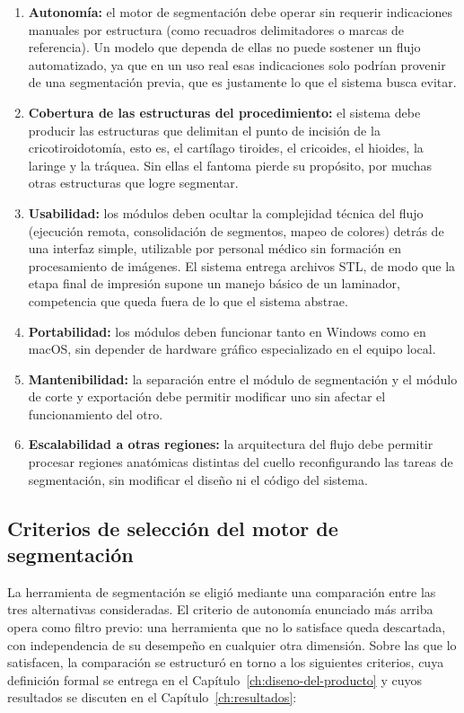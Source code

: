 \begin{enumerate}
  \item \textbf{Autonomía:} el motor de segmentación debe operar sin requerir indicaciones manuales por estructura (como recuadros delimitadores o marcas de referencia). Un modelo que dependa de ellas no puede sostener un flujo automatizado, ya que en un uso real esas indicaciones solo podrían provenir de una segmentación previa, que es justamente lo que el sistema busca evitar.
  \item \textbf{Cobertura de las estructuras del procedimiento:} el sistema debe producir las estructuras que delimitan el punto de incisión de la cricotiroidotomía, esto es, el cartílago tiroides, el cricoides, el hioides, la laringe y la tráquea. Sin ellas el fantoma pierde su propósito, por muchas otras estructuras que logre segmentar.
  \item \textbf{Usabilidad:} los módulos deben ocultar la complejidad técnica del flujo (ejecución remota, consolidación de segmentos, mapeo de colores) detrás de una interfaz simple, utilizable por personal médico sin formación en procesamiento de imágenes. El sistema entrega archivos STL, de modo que la etapa final de impresión supone un manejo básico de un laminador, competencia que queda fuera de lo que el sistema abstrae.
  \item \textbf{Portabilidad:} los módulos deben funcionar tanto en Windows como en macOS, sin depender de hardware gráfico especializado en el equipo local.
  \item \textbf{Mantenibilidad:} la separación entre el módulo de segmentación y el módulo de corte y exportación debe permitir modificar uno sin afectar el funcionamiento del otro.
  \item \textbf{Escalabilidad a otras regiones:} la arquitectura del flujo debe permitir procesar regiones anatómicas distintas del cuello reconfigurando las tareas de segmentación, sin modificar el diseño ni el código del sistema.
\end{enumerate}

\subsection{Criterios de selección del motor de segmentación}

La herramienta de segmentación se eligió mediante una comparación entre las tres alternativas consideradas. El criterio de autonomía enunciado más arriba opera como filtro previo: una herramienta que no lo satisface queda descartada, con independencia de su desempeño en cualquier otra dimensión. Sobre las que lo satisfacen, la comparación se estructuró en torno a los siguientes criterios, cuya definición formal se entrega en el Capítulo~\ref{ch:diseno-del-producto} y cuyos resultados se discuten en el Capítulo~\ref{ch:resultados}:

